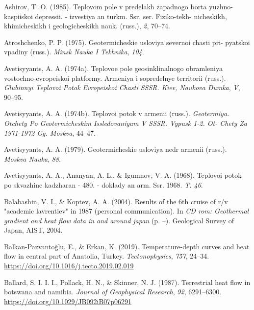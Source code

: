 \documentclass[draft,linenumbers]{agujournal2018}
\begin{document}
\leavevmode{}%
Ashirov, T. O. (1985). Teplovom pole v predelakh zapadnogo borta yuzhno-
kaspiiskoi depressii. - izvestiya an turkm. Ssr, ser. Fiziko-tekh-
nicheskikh, khimicheskikh i geologicheskikh nauk. (russ.), \emph{2},
70--74.

\leavevmode{}%
Atroshchenko, P. P. (1975). Geotermicheskie usloviya severnoi chasti
pri- pyatskoi vpadiny (russ.). \emph{Minsk Nauka I Tekhnika},
\emph{104}.

\leavevmode{}%
Avetisyyants, A. A. (1974a). Teplovoe pole geosinklinalnogo obramleniya
vostochno-evropeiskoi platformy. Armeniya i sopredelnye territorii
(russ.). \emph{Glubinnyi Teplovoi Potok Evropeiskoi Chasti SSSR. Kiev,
Naukova Dumka}, \emph{V}, 90--95.

\leavevmode{}%
Avetisyyants, A. A. (1974b). Teplovoi potok v armenii (russ.).
\emph{Geotermiya. Otchety Po Geotermicheskim Issledovaniyam V SSSR.
Vypusk 1-2. Ot- Chety Za 1971-1972 Gg. Moskva}, 44--47.

\leavevmode{}%
Avetisyyants, A. A. (1979). Geotermicheskie usloviya nedr armenii
(russ.). \emph{Moskva Nauka}, \emph{88}.

\leavevmode{}%
Avetisyyants, A. A., Ananyan, A. L., \& Igumnov, V. A. (1968). Teplovoi
potok po skvazhine kadzharan - 480. - doklady an arm. Ssr. 1968.
\emph{T. 46}.

\leavevmode{}%
Balabashin, V. I., \& Koptev, A. A. (2004). Results of the 6th cruise of
r/v "academic lavrentiev" in 1987 (personal communication). In \emph{CD
rom: Geothermal gradient and heat flow data in and around japan} (p.
--). Geological Survey of Japan, AIST, 2004.

\leavevmode{}%
Balkan-Pazvantoğlu, E., \& Erkan, K. (2019). Temperature-depth curves
and heat flow in central part of {Anatolia}, {Turkey}.
\emph{Tectonophysics}, \emph{757}, 24--34.
\url{https://doi.org/10.1016/j.tecto.2019.02.019}

\leavevmode{}%
Ballard, S. I. I. I., Pollack, H. N., \& Skinner, N. J. (1987).
Terrestrial heat flow in botswana and namibia. \emph{Journal of
Geophysical Research}, \emph{92}, 6291--6300.
\url{https://doi.org/10.1029/JB092iB07p06291}
\end{document}
